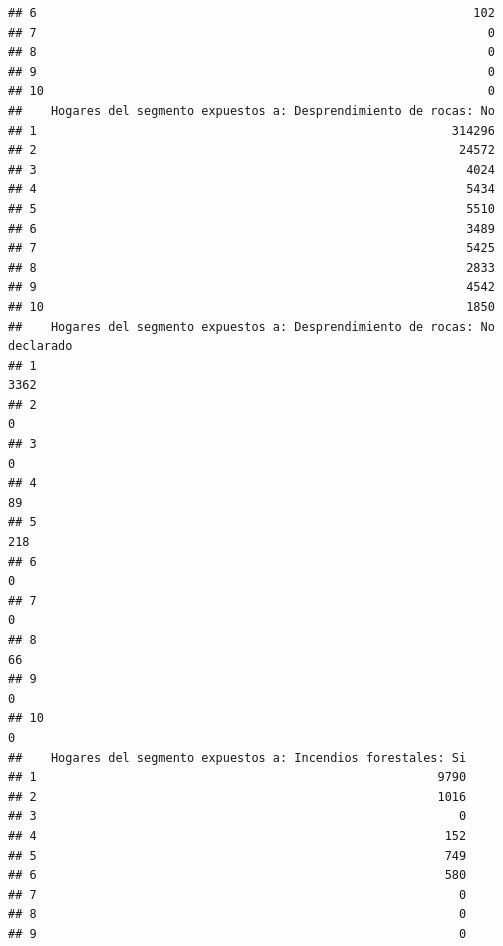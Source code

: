 \documentclass[11pt,]{article}
\begin{document}
\begin{verbatim}
## 6                                                             102
## 7                                                               0
## 8                                                               0
## 9                                                               0
## 10                                                              0
##    Hogares del segmento expuestos a: Desprendimiento de rocas: No
## 1                                                          314296
## 2                                                           24572
## 3                                                            4024
## 4                                                            5434
## 5                                                            5510
## 6                                                            3489
## 7                                                            5425
## 8                                                            2833
## 9                                                            4542
## 10                                                           1850
##    Hogares del segmento expuestos a: Desprendimiento de rocas: No declarado
## 1                                                                      3362
## 2                                                                         0
## 3                                                                         0
## 4                                                                        89
## 5                                                                       218
## 6                                                                         0
## 7                                                                         0
## 8                                                                        66
## 9                                                                         0
## 10                                                                        0
##    Hogares del segmento expuestos a: Incendios forestales: Si
## 1                                                        9790
## 2                                                        1016
## 3                                                           0
## 4                                                         152
## 5                                                         749
## 6                                                         580
## 7                                                           0
## 8                                                           0
## 9                                                           0

\end{verbatim}
\end{document}
